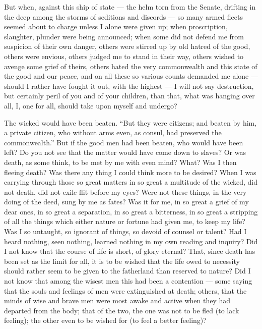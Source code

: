  But when, against this ship of state --- the helm torn from the Senate, drifting in the deep among the storms of seditions and discords --- so many armed fleets seemed about to charge unless I alone were given up; when proscription, slaughter, plunder were being announced; when some did not defend me from suspicion of their own danger, others were stirred up by old hatred of the good, others were envious, others judged me to stand in their way, others wished to avenge some grief of theirs, others hated the very commonwealth and this state of the good and our peace, and on all these so various counts demanded me alone --- should I rather have fought it out, with the highest --- I will not say destruction, but certainly peril of you and of your children, than that, what was hanging over all, I, one for all, should take upon myself and undergo?

 The wicked would have been beaten. ``But they were citizens; and beaten by him, a private citizen, who without arms even, as consul, had preserved the commonwealth.'' But if the good men had been beaten, who would have been left? Do you not see that the matter would have come down to slaves? Or was death, as some think, to be met by me with even mind? What? Was I then fleeing death? Was there any thing I could think more to be desired? When I was carrying through those so great matters in so great a multitude of the wicked, did not death, did not exile flit before my eyes? Were not these things, in the very doing of the deed, sung by me as fates? Was it for me, in so great a grief of my dear ones, in so great a separation, in so great a bitterness, in so great a stripping of all the things which either nature or fortune had given me, to keep my life? Was I so untaught, so ignorant of things, so devoid of counsel or talent? Had I heard nothing, seen nothing, learned nothing in my own reading and inquiry? Did I not know that the course of life is short, of glory eternal? That, since death has been set as the limit for all, it is to be wished that the life owed to necessity should rather seem to be given to the fatherland than reserved to nature? Did I not know that among the wisest men this had been a contention --- some saying that the souls and feelings of men were extinguished at death; others, that the minds of wise and brave men were most awake and active when they had departed from the body; that of the two, the one was not to be fled (to lack feeling); the other even to be wished for (to feel a better feeling)?

